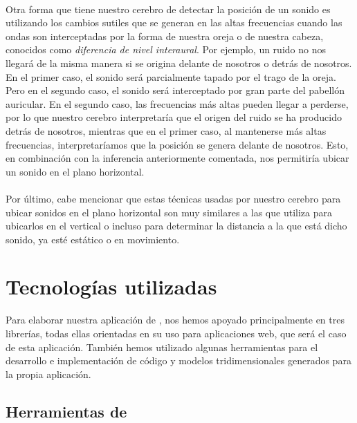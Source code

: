 \documentclass{subfiles}
\begin{document}
        \paragraph{}
        Otra forma que tiene nuestro cerebro de detectar la posición de un sonido es utilizando los cambios sutiles que se generan en las altas frecuencias cuando las ondas son interceptadas por la forma de nuestra oreja o de nuestra cabeza, conocidos como \textit{diferencia de nivel interaural}. Por ejemplo, un ruido no nos llegará de la misma manera si se origina delante de nosotros o detrás de nosotros. En el primer caso, el sonido será parcialmente tapado por el trago de la oreja. Pero en el segundo caso, el sonido será interceptado por gran parte del pabellón auricular. En el segundo caso, las frecuencias más altas pueden llegar a perderse, por lo que nuestro cerebro interpretaría que el origen del ruido se ha producido detrás de nosotros, mientras que en el primer caso, al mantenerse más altas frecuencias, interpretaríamos que la posición se genera delante de nosotros. Esto, en combinación con la inferencia anteriormente comentada, nos permitiría ubicar un sonido en el plano horizontal.

        \paragraph{}
        Por último, cabe mencionar que estas técnicas usadas por nuestro cerebro para ubicar sonidos en el plano horizontal son muy similares a las que utiliza para ubicarlos en el vertical o incluso para determinar la distancia a la que está dicho sonido, ya esté estático o en movimiento.
        
        \section{Tecnologías utilizadas}
        \label{sec:tecnologias_utilizadas}

        Para elaborar nuestra aplicación de \ra, nos hemos apoyado principalmente en tres librerías, todas ellas orientadas en su uso para aplicaciones web, que será el caso de esta aplicación. También hemos utilizado algunas herramientas para el desarrollo e implementación de código y modelos tridimensionales generados para la propia aplicación.

        \subsection{Herramientas de \ra}
        \label{sec:herramientas_de_ra}
\end{document}
